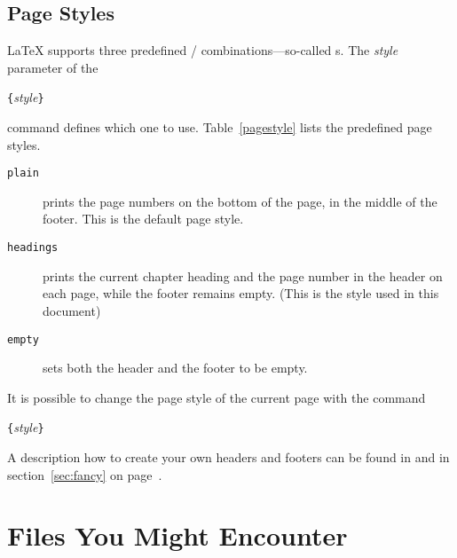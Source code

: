 \subsection{Page Styles}
 
\LaTeX{} supports three predefined /
combinations---so-called s. The \emph{style} parameter
of the 
\begin{lscommand}
\verb|{|\emph{style}\verb|}|
\end{lscommand}
\noindent command defines which one to use. 
Table~\ref{pagestyle}
lists the predefined page styles.

\begin{table}[!hbp]
\caption{The Predefined Page Styles of \LaTeX.} \label{pagestyle}
\begin{lined}{12cm}
\begin{description}

\item[\normalfont\texttt{plain}] prints the page numbers on the bottom
  of the page, in the middle of the footer. This is the default page
  style.

\item[\normalfont\texttt{headings}] prints the current chapter heading
  and the page number in the header on each page, while the footer
  remains empty.  (This is the style used in this document)
\item[\normalfont\texttt{empty}] sets both the header and the footer
  to be empty.

\end{description}
\end{lined}
\end{table}

It is possible to change the page style of the current page
with the command
\begin{lscommand}
\verb|{|\emph{style}\verb|}|
\end{lscommand}
A description how to create your own
headers and footers can be found in \companion{} and in section~\ref{sec:fancy} on page~\pageref{sec:fancy}.
%
%

\section{Files You Might Encounter}

